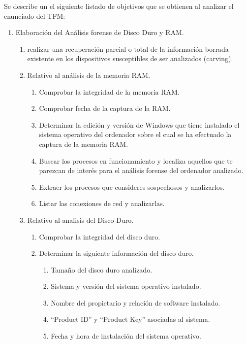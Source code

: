 Se describe un el siguiente listado de objetivos que se obtienen al analizar el enunciado del TFM:

\begin{enumerate}
    \item Elaboración del Análisis forense de Disco Duro y RAM.
    \begin{enumerate}
        \item realizar una recuperación parcial o total de la información borrada existente en los dispositivos susceptibles de ser analizados (carving).
        \item Relativo al análisis de la memoria RAM.
        \begin{enumerate}
            \item Comprobar la integridad de la memoria RAM.
            \item Comprobar fecha de la captura de la RAM.
            \item Determinar la edición y versión de Windows que tiene instalado el sistema operativo del ordenador sobre el cual se ha efectuado la captura de la memoria RAM.
            \item Buscar los procesos en funcionamiento y localiza aquellos que te parezcan de interés para el análisis forense del ordenador analizado.
            \item Extraer los procesos que consideres sospechosos y analizarlos.
            \item Listar las conexiones de red y analizarlas.
        \end{enumerate}
        \item Relativo al analisis del Disco Duro.
        \begin{enumerate}
            \item Comprobar la integridad del disco duro.
            \item Determinar la siguiente información del disco duro.
            \begin{enumerate}
                \item Tamaño del disco duro analizado.
                \item Sistema y versión del sistema operativo instalado.
                \item Nombre del propietario y relación de software instalado.
                \item “Product ID” y “Product Key” asociadas al sistema.
                \item Fecha y hora de instalación del sistema operativo.

\end{enumerate}
\end{enumerate}
\end{enumerate}
\end{enumerate}
